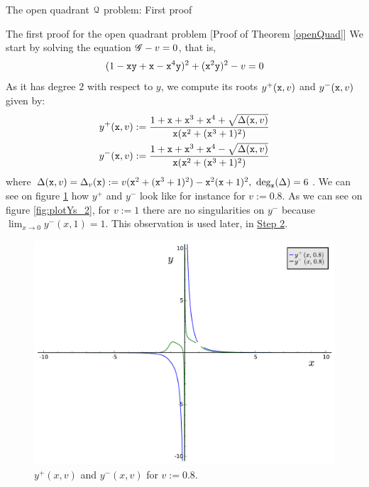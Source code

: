 \documentclass[11pt, a4paper, english, twoside, notitlepage, openright]{report}
\begin{document}
\begin{chapter}{The open quadrant $\mathcal{Q}$ problem: First proof}
\begin{section}{The first proof for the open quadrant problem} [Proof of Theorem \ref{openQuad}]
We start by solving the equation $\mathscr{G}-v=0$, that is, 
$$
(1-{\tt x}{\tt y}+{\tt x}-{\tt x}^4{\tt y})^2+({\tt x}^2{\tt y})^2-v=0
$$ 
As it has degree $2$ with respect to $y$, we compute its roots $y^+({\tt x},v)$ and $y^-({\tt x},v)$ given by:
\begin{equation*}
\begin{aligned}
y^+({\tt x},v)&:=\frac{1+{\tt x}+{\tt x}^3+{\tt x}^4+\sqrt{\Delta({\tt x},v)}}{{\tt x}({\tt x}^2+({\tt x}^3+1)^2)}\\
y^-({\tt x},v)&:=\frac{1+{\tt x}+{\tt x}^3+{\tt x}^4-\sqrt{\Delta({\tt x},v)}}{{\tt x}({\tt x}^2+({\tt x}^3+1)^2)}\\
\end{aligned}
\end{equation*}
where $\Delta({\tt x},v)=\Delta_v({\tt x}):=v({\tt x}^2+({\tt x}^3+1)^2)-{\tt x}^2({\tt x}+1)^2,\ \text{deg}_{\tt x}(\Delta)=6$. We can see on figure \ref{fig:plotYs_1} how $y^+$ and $y^-$ look like for instance for $v:=0.8$. As we can see on figure \ref{fig:plotYs_2}, for $v:=1$ there are no singularities on $y^-$ because $\lim_{x\rightarrow0}y^-(x,1)=1$. This observation is used later, in \hyperref[step2]{Step 2}.
\begin{figure}[h]
\centering
\includegraphics[width=1\textwidth]{plots/ch1_06_sols.pdf}
\caption{$y^+(x,v)$ and $y^-(x,v)$ for $v:= 0.8$.\label{fig:plotYs_1}}
\end{figure}
\begin{figure}[h]
\centering

\end{figure}
\end{section}
\end{chapter}
\end{document}
